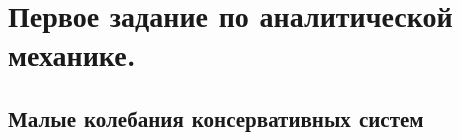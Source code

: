 



\section{Первое задание по аналитической механике.}


\subsection{Малые колебания консервативных систем}



% 

